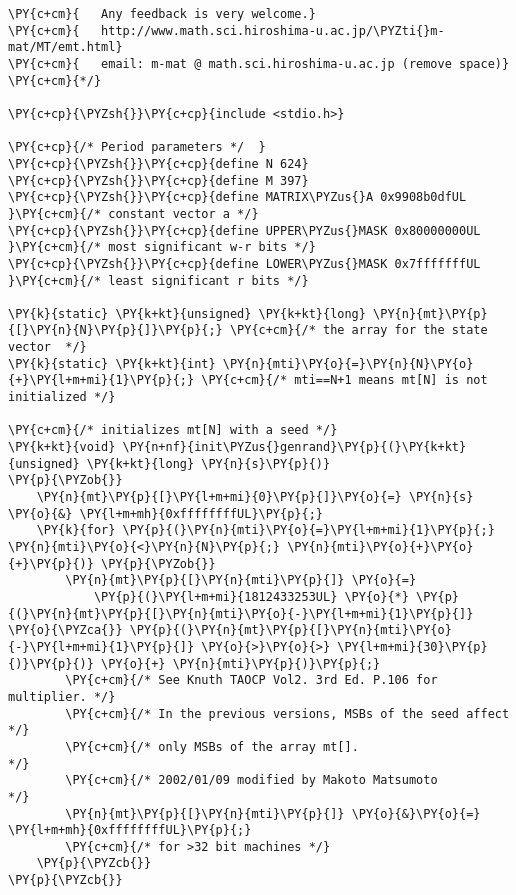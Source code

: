 \begin{Verbatim}[commandchars=\\\{\}]
\PY{c+cm}{   Any feedback is very welcome.}
\PY{c+cm}{   http://www.math.sci.hiroshima-u.ac.jp/\PYZti{}m-mat/MT/emt.html}
\PY{c+cm}{   email: m-mat @ math.sci.hiroshima-u.ac.jp (remove space)}
\PY{c+cm}{*/}

\PY{c+cp}{\PYZsh{}}\PY{c+cp}{include <stdio.h>}

\PY{c+cp}{/* Period parameters */  }
\PY{c+cp}{\PYZsh{}}\PY{c+cp}{define N 624}
\PY{c+cp}{\PYZsh{}}\PY{c+cp}{define M 397}
\PY{c+cp}{\PYZsh{}}\PY{c+cp}{define MATRIX\PYZus{}A 0x9908b0dfUL   }\PY{c+cm}{/* constant vector a */}
\PY{c+cp}{\PYZsh{}}\PY{c+cp}{define UPPER\PYZus{}MASK 0x80000000UL }\PY{c+cm}{/* most significant w-r bits */}
\PY{c+cp}{\PYZsh{}}\PY{c+cp}{define LOWER\PYZus{}MASK 0x7fffffffUL }\PY{c+cm}{/* least significant r bits */}

\PY{k}{static} \PY{k+kt}{unsigned} \PY{k+kt}{long} \PY{n}{mt}\PY{p}{[}\PY{n}{N}\PY{p}{]}\PY{p}{;} \PY{c+cm}{/* the array for the state vector  */}
\PY{k}{static} \PY{k+kt}{int} \PY{n}{mti}\PY{o}{=}\PY{n}{N}\PY{o}{+}\PY{l+m+mi}{1}\PY{p}{;} \PY{c+cm}{/* mti==N+1 means mt[N] is not initialized */}

\PY{c+cm}{/* initializes mt[N] with a seed */}
\PY{k+kt}{void} \PY{n+nf}{init\PYZus{}genrand}\PY{p}{(}\PY{k+kt}{unsigned} \PY{k+kt}{long} \PY{n}{s}\PY{p}{)}
\PY{p}{\PYZob{}}
	\PY{n}{mt}\PY{p}{[}\PY{l+m+mi}{0}\PY{p}{]}\PY{o}{=} \PY{n}{s} \PY{o}{&} \PY{l+m+mh}{0xffffffffUL}\PY{p}{;}
	\PY{k}{for} \PY{p}{(}\PY{n}{mti}\PY{o}{=}\PY{l+m+mi}{1}\PY{p}{;} \PY{n}{mti}\PY{o}{<}\PY{n}{N}\PY{p}{;} \PY{n}{mti}\PY{o}{+}\PY{o}{+}\PY{p}{)} \PY{p}{\PYZob{}}
		\PY{n}{mt}\PY{p}{[}\PY{n}{mti}\PY{p}{]} \PY{o}{=} 
			\PY{p}{(}\PY{l+m+mi}{1812433253UL} \PY{o}{*} \PY{p}{(}\PY{n}{mt}\PY{p}{[}\PY{n}{mti}\PY{o}{-}\PY{l+m+mi}{1}\PY{p}{]} \PY{o}{\PYZca{}} \PY{p}{(}\PY{n}{mt}\PY{p}{[}\PY{n}{mti}\PY{o}{-}\PY{l+m+mi}{1}\PY{p}{]} \PY{o}{>}\PY{o}{>} \PY{l+m+mi}{30}\PY{p}{)}\PY{p}{)} \PY{o}{+} \PY{n}{mti}\PY{p}{)}\PY{p}{;} 
		\PY{c+cm}{/* See Knuth TAOCP Vol2. 3rd Ed. P.106 for multiplier. */}
		\PY{c+cm}{/* In the previous versions, MSBs of the seed affect   */}
		\PY{c+cm}{/* only MSBs of the array mt[].                        */}
		\PY{c+cm}{/* 2002/01/09 modified by Makoto Matsumoto             */}
		\PY{n}{mt}\PY{p}{[}\PY{n}{mti}\PY{p}{]} \PY{o}{&}\PY{o}{=} \PY{l+m+mh}{0xffffffffUL}\PY{p}{;}
		\PY{c+cm}{/* for >32 bit machines */}
	\PY{p}{\PYZcb{}}
\PY{p}{\PYZcb{}}


\end{Verbatim}
